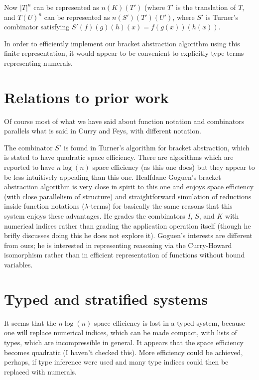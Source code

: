 \documentclass{article}
\begin{document}
Now $|T|^n$ can be represented as $n(K)(T')$ (where $T'$ is the
translation of $T$, and $T(U)^n$ can be represented as
$n(S')(T')(U')$, where $S'$ is Turner's combinator satisfying
$S'(f)(g)(h)(x) = f(g(x))(h(x))$.

In order to efficiently implement our bracket abstraction algorithm
using this finite representation, it would appear to be convenient to
explicitly type terms representing numerals.

\section{Relations to prior work}

Of course most of what we have said about function notation and combinators
parallels what is said in Curry and Feys, with different notation.

The combinator $S'$ is found in Turner's algorithm for bracket
abstraction, which is stated to have quadratic space efficiency.
There are algorithms which are reported to have $n\log(n)$ space
efficiency (as this one does) but they appear to be less intuitively
appealing than this one.  Healfdane Goguen's bracket abstraction
algorithm is very close in spirit to this one and enjoys space
efficiency (with close parallelism of structure) and straightforward
simulation of reductions inside function notations ($\lambda$-terms)
for basically the same reasons that this system enjoys these
advantages.  He grades the combinators $I$, $S$, and $K$ with
numerical indices rather than grading the application operation itself
(though he brifly discusses doing this he does not explore it).
Goguen's interests are different from ours; he is interested in
representing reasoning via the Curry-Howard isomorphism rather than in
efficient representation of functions without bound variables.

\section{Typed and stratified systems}

It seems that the $n\log(n)$ space efficiency is lost in a typed system,
because one will replace numerical indices, which can be made compact, with
lists of types, which are incompressible in general.  It appears that the space
efficiency becomes quadratic (I haven't checked this).  More efficiency could
be achieved, perhaps, if type inference were used and many type indices could
then be replaced with numerals.
\end{document}
